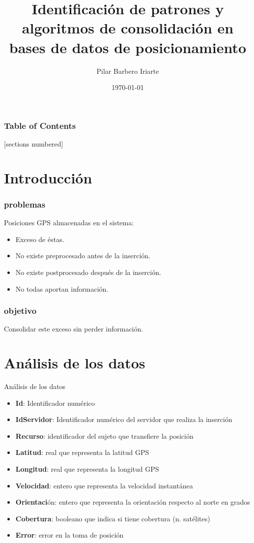 \documentclass[10pt, spanish]{beamer}
\title{Identificaci\'on de patrones y algoritmos de consolidaci\'on en bases de datos de posicionamiento}
\date{\today}
\author{Pilar Barbero Iriarte}
\institute{Universidad de Zaragoza}
\begin{document}
\maketitle

\begin{frame}
  \frametitle{Table of Contents}
  [sections numbered]
  \tableofcontents[hideallsubsections]
\end{frame}

\section{Introducci\'on}

\begin{frame}[fragile]
  \frametitle{problemas}  
	Posiciones GPS almacenadas en el sistema:
	\begin{itemize}
		\item Exceso de \'estas.
		\item No existe preprocesado antes de la inserci\'on.
		\item No existe postprocesado despu\'es de la inserci\'on.
		\item No todas aportan informaci\'on.
	\end{itemize}
\end{frame}

\begin{frame}[fragile]
  \frametitle{objetivo}
  		Consolidar este exceso sin perder informaci\'on.
\end{frame}

\section{An\'alisis de los datos}

\begin{frame}{An\'alisis de los datos}
  \begin{itemize}[<+- | alert@+>]    
\item \textbf{Id}: Identificador num\'erico
\item \textbf{IdServidor}: Identificador num\'erico del servidor que realiza la inserci\'on
\item \textbf{Recurso}: identificador del sujeto que transfiere la posici\'on
\item \textbf{Latitud}: real que representa la latitud GPS
\item \textbf{Longitud}: real que representa la longitud GPS
\item \textbf{Velocidad}: entero que representa la velocidad instant\'anea
\item \textbf{Orientaci}\'on: entero que representa la orientaci\'on respecto al norte en grados
\item \textbf{Cobertura}: booleano que indica si tiene cobertura (n. sat\'elites)
\item \textbf{Error}: error en la toma de posici\'on
  \end{itemize}
\end{frame}
\end{document}

